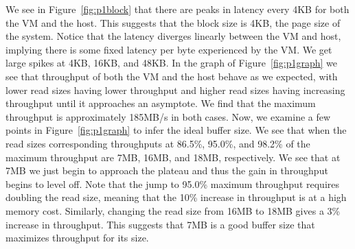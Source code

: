 We see in Figure~\ref{fig:p1block} that there are peaks in latency every 4KB for 
both the VM and the host. This suggests that the block size is 4KB, the page size
of the system. Notice that the latency diverges linearly between the VM and host,
implying there is some fixed latency per byte experienced by the VM. We get large
spikes at 4KB, 16KB, and 48KB.
In the graph of Figure~\ref{fig:p1graph} we see that throughput of 
both the VM and the host behave
as we expected, with lower read sizes having lower throughput and higher read sizes
having increasing throughput until it approaches an asymptote. We find that the 
maximum throughput is approximately 185MB/s in both cases. Now, we examine a few
points in Figure~\ref{fig:p1graph} to infer the ideal buffer size. We see that when 
the read sizes corresponding throughputs at 86.5\%, 95.0\%, and 98.2\% of the maximum 
throughput are 7MB, 16MB, and 18MB, respectively. We see that at 7MB we just begin to 
approach the plateau and thus the gain in throughput begins to level off.
Note that the jump to 95.0\% maximum throughput requires doubling the read size, 
meaning that the 10\% increase in throughput is at a high memory cost. Similarly, 
changing the read size from 16MB to 18MB gives a 3\% increase in throughput. This 
suggests that 7MB is a good buffer size that maximizes throughput for its size.



